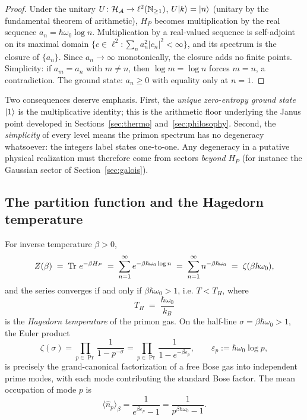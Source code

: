 \begin{proof}
Under the unitary $U\colon\mathcal{H}_{\mathcal{A}}\to\ell^{2}(\mathbb{N}_{\geq 1})$,
$U\lvert k\rangle=\lvert n\rangle$ (unitary by the fundamental theorem of arithmetic),
$H_{P}$ becomes multiplication by the real sequence
$a_{n}=\hbar\omega_{0}\log n$. Multiplication by a real-valued sequence is self-adjoint on its
maximal domain $\{c\in\ell^{2}:\sum_{n}a_{n}^{2}|c_{n}|^{2}<\infty\}$, and its spectrum is the
closure of $\{a_{n}\}$. Since $a_{n}\to\infty$ monotonically, the closure adds no finite
points. Simplicity: if $a_{m}=a_{n}$ with $m\neq n$, then $\log m=\log n$ forces $m=n$, a
contradiction. The ground state: $a_{n}\geq 0$ with equality only at $n=1$.
\end{proof}

Two consequences deserve emphasis. First, the \emph{unique zero-entropy ground state} $\lvert 1\rangle$
is the multiplicative identity; this is the arithmetic floor underlying the Janus point
developed in Sections~\ref{sec:thermo} and~\ref{sec:philosophy}. Second, the \emph{simplicity}
of every level means the primon spectrum has no degeneracy whatsoever: the integers label
states one-to-one. Any degeneracy in a putative physical realization must therefore come from
sectors \emph{beyond} $H_{P}$ (for instance the Gaussian sector of Section~\ref{sec:galois}).

\subsection{The partition function and the Hagedorn temperature}

\begin{proposition}\label{prop:partition}
For inverse temperature $\beta>0$,
\begin{equation}\label{eq:zetaZ}
Z(\beta)\;=\;\operatorname{Tr}\,e^{-\beta H_{P}}
\;=\;\sum_{n=1}^{\infty}e^{-\beta\hbar\omega_{0}\log n}
\;=\;\sum_{n=1}^{\infty}n^{-\beta\hbar\omega_{0}}
\;=\;\zeta(\beta\hbar\omega_{0}),
\end{equation}
and the series converges if and only if $\beta\hbar\omega_{0}>1$, i.e.
$T<T_{H}$, where
\begin{equation}\label{eq:hagedornT}
T_{H}\;=\;\frac{\hbar\omega_{0}}{k_{B}}
\end{equation}
is the \emph{Hagedorn temperature} of the primon gas. On the half-line $\sigma=\beta\hbar\omega_{0}>1$,
the Euler product
\begin{equation}\label{eq:eulerproduct}
\zeta(\sigma)=\prod_{p\in\Pr}\frac{1}{1-p^{-\sigma}}
=\prod_{p\in\Pr}\frac{1}{1-e^{-\beta\varepsilon_{p}}},
\qquad \varepsilon_{p}:=\hbar\omega_{0}\log p,
\end{equation}
is precisely the grand-canonical factorization of a free Bose gas into independent prime modes,
with each mode contributing the standard Bose factor. The mean occupation of mode $p$ is
\begin{equation}
\langle \hat n_{p}\rangle_{\beta}=\frac{1}{e^{\beta\varepsilon_{p}}-1}
=\frac{1}{p^{\beta\hbar\omega_{0}}-1}.
\end{equation}
\end{proposition}

